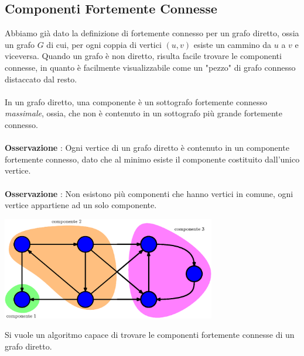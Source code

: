 \documentclass[12pt, letterpaper]{article}
\newcommand{\acc}{\\\hphantom{}\\}
\begin{document}
\subsection{Componenti Fortemente Connesse}
Abbiamo già dato la definizione di fortemente connesso per un grafo diretto, ossia un grafo $G$ di cui, 
per ogni coppia di vertici $(u,v)$ esiste un cammino da $u$ a $v$ e viceversa. Quando un grafo è non diretto, risulta 
facile trovare le componenti connesse, in quanto è facilmente visualizzabile come un "pezzo" di grafo connesso 
distaccato dal resto.\acc 
In un grafo diretto, una componente è un sottografo fortemente connesso \textit{massimale}, ossia, che non è contenuto in 
un sottografo più grande fortemente connesso.\acc 
\textbf{Osservazione} : Ogni vertice di un grafo diretto è contenuto in un componente fortemente connesso, dato che 
al minimo esiste il componente costituito dall'unico vertice.\acc 
\textbf{Osservazione} : Non esistono più componenti che hanno vertici in comune, ogni vertice appartiene ad un solo 
componente.\begin{center}
    \includegraphics[width=0.7\textwidth ]{images/compoGrafDir.eps}
\end{center}
Si vuole un algoritmo capace di trovare le componenti fortemente connesse di un grafo diretto.
\end{document}
